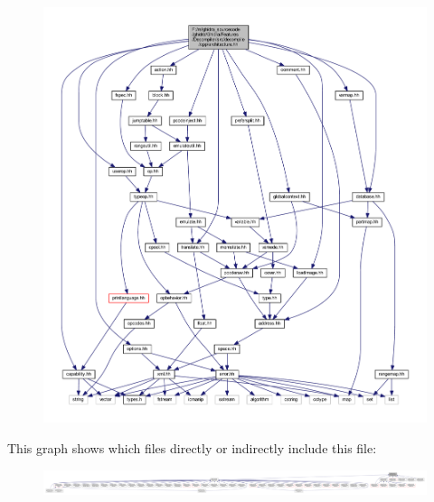 \begin{figure}[H]
\begin{center}
\leavevmode
\includegraphics[width=350pt]{architecture_8hh__incl}
\end{center}
\end{figure}
This graph shows which files directly or indirectly include this file\+:
\nopagebreak
\begin{figure}[H]
\begin{center}
\leavevmode
\includegraphics[width=350pt]{architecture_8hh__dep__incl}
\end{center}
\end{figure}
